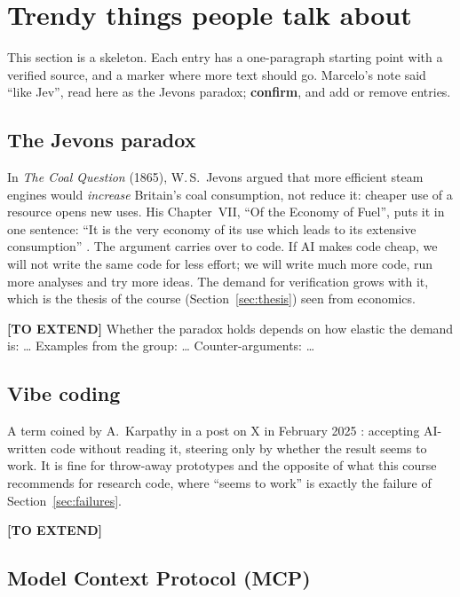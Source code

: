 \section{Trendy things people talk about}\label{sec:trends}

\begin{placeholder}
This section is a skeleton. Each entry has a one-paragraph starting point with a verified
source, and a marker where more text should go. Marcelo's note said ``like Jev'',
read here as the Jevons paradox; \textbf{confirm}, and add or remove entries.
\end{placeholder}

\subsection{The Jevons paradox}

In \emph{The Coal Question} (1865), W.\,S.~Jevons argued that more efficient steam engines
would \emph{increase} Britain's coal consumption, not reduce it: cheaper use of a resource
opens new uses. His Chapter~VII, ``Of the Economy of Fuel'', puts it in one sentence: ``It
is the very economy of its use which leads to its extensive consumption'' .
The argument carries over to code. If AI makes code cheap, we will not write the same
code for less effort; we will write much more code, run more analyses and try more
ideas. The demand for verification grows with it, which is the thesis of the course
(Section~\ref{sec:thesis}) seen from economics.

\textbf{[TO EXTEND]} Whether the paradox holds depends on how elastic the demand is:
\dots{} Examples from the group: \dots{} Counter-arguments: \dots{}

\subsection{Vibe coding}

A term coined by A.~Karpathy in a post on X in February 2025 : accepting
AI-written code without reading it, steering only by whether the result seems to work. It
is fine for throw-away prototypes and the opposite of what this course recommends for
research code, where ``seems to work'' is exactly the failure of
Section~\ref{sec:failures}.

\textbf{[TO EXTEND]}

\subsection{Model Context Protocol (MCP)}

